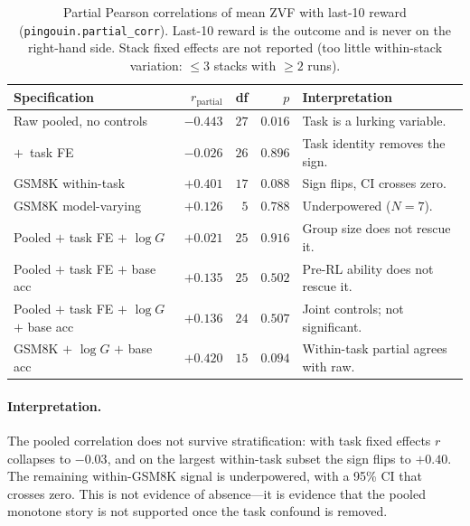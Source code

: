 \documentclass{article}
\begin{document}
\begin{table}[h]
\centering\small
\begin{tabular}{lrrrl}
\toprule
Specification & $r_{\text{partial}}$ & df & $p$ & Interpretation \\
\midrule
Raw pooled, no controls                          & $-0.443$ & $27$ & $0.016$ & Task is a lurking variable. \\
$+$~task FE                                      & $-0.026$ & $26$ & $0.896$ & Task identity removes the sign. \\
GSM8K within-task                                & $+0.401$ & $17$ & $0.088$ & Sign flips, CI crosses zero. \\
GSM8K model-varying                              & $+0.126$ & $5$  & $0.788$ & Underpowered ($N{=}7$). \\
Pooled $+$ task FE $+$ $\log G$                  & $+0.021$ & $25$ & $0.916$ & Group size does not rescue it. \\
Pooled $+$ task FE $+$ base acc                  & $+0.135$ & $25$ & $0.502$ & Pre-RL ability does not rescue it. \\
Pooled $+$ task FE $+$ $\log G$ $+$ base acc     & $+0.136$ & $24$ & $0.507$ & Joint controls; not significant. \\
GSM8K $+$ $\log G$ $+$ base acc                  & $+0.420$ & $15$ & $0.094$ & Within-task partial agrees with raw. \\
\bottomrule
\end{tabular}
\caption{Partial Pearson correlations of mean ZVF with last-10 reward
(\texttt{pingouin.partial\_corr}). Last-10 reward is the outcome and is never
on the right-hand side. Stack fixed effects are not reported (too little
within-stack variation: $\le 3$ stacks with $\ge 2$ runs).}
\label{tab:zvf-partials}
\end{table}

\paragraph{Interpretation.}
The pooled correlation does not survive stratification: with task fixed
effects $r$ collapses to $-0.03$, and on the largest within-task subset the
sign flips to $+0.40$. The remaining within-GSM8K signal is underpowered,
with a 95\% CI that crosses zero. This is not evidence of absence---it is
evidence that the pooled monotone story is not supported once the task
confound is removed.
 
\end{document}
